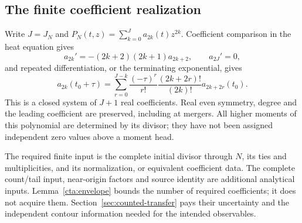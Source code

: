 \subsection{The finite coefficient realization}

Write $J=J_N$ and $P_N(t,z)=\sum_{k=0}^J a_{2k}(t)z^{2k}$.
Coefficient comparison in the heat equation gives
\begin{equation}
 a_{2k}'=-(2k+2)(2k+1)a_{2k+2},\qquad a_{2J}'=0,
 \label{cta:coefficient-flow}
\end{equation}
and repeated differentiation, or the terminating exponential, gives
\begin{equation}
 a_{2k}(t_0+\tau)=\sum_{r=0}^{J-k}
 \frac{(-\tau)^r}{r!}\frac{(2k+2r)!}{(2k)!}a_{2k+2r}(t_0).
 \label{cta:coefficient-solution}
\end{equation}
This is a closed system of $J+1$ real coefficients. Real even symmetry,
degree and the leading coefficient are preserved, including at mergers.
All higher moments of this polynomial are determined by its divisor;
they have not been assigned independent zero values above a moment head.

The required finite input is the complete initial divisor through $N$,
its ties and multiplicities, and its normalization, or equivalent
coefficient data. The complete count/tail input, near-origin factors and
source identity are additional analytical inputs. Lemma~\ref{cta:envelope}
bounds the number of required coefficients; it does not acquire them.
Section~\ref{sec:counted-transfer} pays their uncertainty and the
independent contour information needed for the intended observables.
